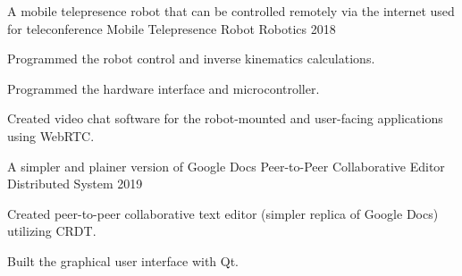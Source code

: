 

\begin{cventries}
    \cventry
        {A mobile telepresence robot that can be controlled remotely via the internet used for teleconference} %
        {Mobile Telepresence Robot} %
        {Robotics} %
        {2018} %
        {
            \begin{cvitems} %
                \item {Programmed the robot control and inverse kinematics calculations.}
                \item {Programmed the hardware interface and microcontroller.}
                \item {Created video chat software for the robot-mounted and user-facing applications using WebRTC.}
            \end{cvitems}
        }
    
    \cventry
        {A simpler and plainer version of Google Docs} %
        {Peer-to-Peer Collaborative Editor} %
        {Distributed System} %
        {2019} %
        {
            \begin{cvitems} %
                \item {Created peer-to-peer collaborative text editor (simpler replica of Google Docs) utilizing CRDT.}
                \item {Built the graphical user interface with Qt.}
            \end{cvitems}
        }
\end{cventries}
